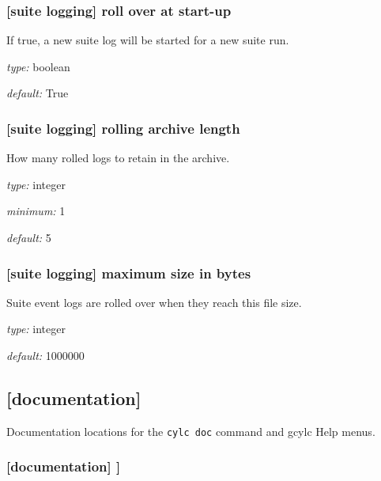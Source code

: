 \subsubsection[roll over at start-up]{[suite logging] \textrightarrow roll over at start-up}

If true, a new suite log will be started for a new suite run.

\begin{myitemize}
\item {\em type:} boolean
\item {\em default:} True
\end{myitemize}

\subsubsection[rolling archive length]{[suite logging] \textrightarrow rolling archive length}

How many rolled logs to retain in the archive.

\begin{myitemize}
\item {\em type:} integer
\item {\em minimum:} 1
\item {\em default:} 5
\end{myitemize}

\subsubsection[maximum size in bytes]{[suite logging] \textrightarrow maximum size in bytes}

Suite event logs are rolled over when they reach this file size.

\begin{myitemize}
\item {\em type:} integer
\item {\em default:} 1000000
\end{myitemize}

\subsection{[documentation]}

Documentation locations for the \lstinline=cylc doc= command and gcylc
Help menus.

\subsubsection[{[[}files{]]}]{[documentation] \textrightarrow [[files]]}

